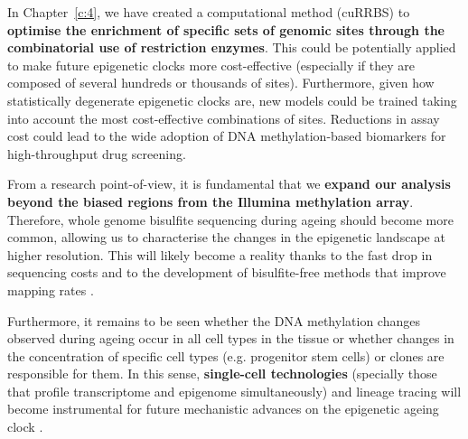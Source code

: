 \smallskip

In Chapter~\ref{c:4}, we have created a computational method (cuRRBS) to \textbf{optimise the enrichment of specific sets of genomic sites through the combinatorial use of restriction enzymes}. This could be potentially applied to make future epigenetic clocks more cost-effective (especially if they are composed of several hundreds or thousands of sites). Furthermore, given how statistically degenerate epigenetic clocks are, new models could be trained taking into account the most cost-effective combinations of sites. Reductions in assay cost could lead to the wide adoption of DNA methylation-based biomarkers for high-throughput drug screening.

\bigskip

From a research point-of-view, it is fundamental that we \textbf{expand our analysis beyond the biased regions from the Illumina methylation array}. Therefore, whole genome bisulfite sequencing during ageing should become more common, allowing us to characterise the changes in the epigenetic landscape at higher resolution. This will likely become a reality thanks to the fast drop in sequencing costs and to the development of bisulfite-free methods that improve mapping rates \citep{Liu2019}. 

\bigskip

Furthermore, it remains to be seen whether the DNA methylation changes observed during ageing occur in all cell types in the tissue or whether changes in the concentration of specific cell types (e.g. progenitor stem cells) or clones are responsible for them. In this sense, \textbf{single-cell technologies} (specially those that profile  transcriptome and epigenome simultaneously) and lineage tracing will become instrumental for future mechanistic advances on the epigenetic ageing clock \citep{Kelsey2017}.
